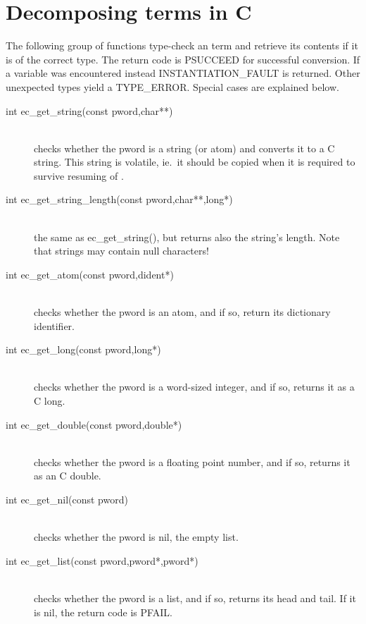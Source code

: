 \section{Decomposing {\eclipse} terms in C}
The following group of functions type-check an {\eclipse} term and
retrieve its contents if it is of the correct type.
The return code is PSUCCEED for successful conversion.
If a variable was encountered instead INSTANTIATION_FAULT is returned.
Other unexpected types yield a TYPE_ERROR. Special cases are explained below.
\begin{description}

\item[int		ec_get_string(const pword,char**)]\ \\
	checks whether the {\eclipse} pword is a string (or atom) and converts
	it to a C string. This string is volatile, ie.\ it should be copied
	when it is required to survive resuming of {\eclipse}.

\item[int		ec_get_string_length(const pword,char**,long*)]\ \\
	the same as ec_get_string(), but returns also the string's length.
	Note that {\eclipse} strings may contain null characters!

\item[int		ec_get_atom(const pword,dident*)]\ \\
	checks whether the {\eclipse} pword is an atom, and if so,
	return its dictionary identifier.

\item[int		ec_get_long(const pword,long*)]\ \\
	checks whether the {\eclipse} pword is a word-sized integer,
	and if so, returns it as a C long.

\item[int		ec_get_double(const pword,double*)]\ \\
	checks whether the {\eclipse} pword is a floating point number,
	and if so, returns it as an C double.

\item[int		ec_get_nil(const pword)]\ \\
	checks whether the {\eclipse} pword is nil, the empty list.

\item[int		ec_get_list(const pword,pword*,pword*)]\ \\
	checks whether the {\eclipse} pword is a list, and if so,
	returns its head and tail. If it is nil, the return code is PFAIL.


\end{description}
